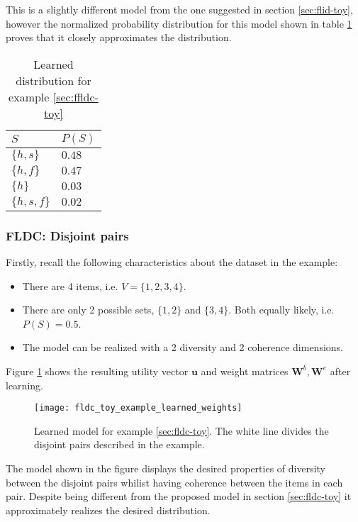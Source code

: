 This is a slightly different model from the one suggested in section \ref{sec:flid-toy}, however the normalized probability distribution for this model shown in table \ref{tab:flid-toy-learned-probs} proves that it closely approximates the distribution.

\begin{table}
  \centering
  \caption{Learned distribution for example \ref{sec:ffldc-toy}}
  \begin{tabular}{@{}ll@{}}
    \toprule
    $S$ & $P(S)$\\
    \midrule
    $\{h,s\}$ & $0.48$ \\
    $\{h,f\}$ & $0.47$ \\
    $\{h\}$ & $0.03$ \\
    $\{h,s,f\}$ & $0.02$ \\
    \bottomrule
  \end{tabular}
  \label{tab:flid-toy-learned-probs}
\end{table}

\subsubsection{FLDC: Disjoint pairs}

Firstly, recall the following characteristics about the dataset in the example:

\begin{itemize}
  \item There are 4 items, i.e. $V = \{1,2,3,4\}$.
  \item There are only 2 possible sets, $\{1,2\}$ and $\{3,4\}$. Both equally likely, i.e. $P(S) = 0.5$.
  \item The model can be realized with a 2 diversity and 2 coherence dimensions.
\end{itemize}

Figure \ref{fig:fldc-toy-learned-weights} shows the resulting utility vector $\mathbf{u}$ and weight matrices $\mathbf{W}^{b}, \mathbf{W}^{e}$ after learning.

\begin{figure}
  \centering
  \texttt{[image: fldc\_toy\_example\_learned\_weights]}
  \caption{Learned model for example \ref{sec:fldc-toy}. The white line divides the disjoint pairs described in the example.}
  \label{fig:fldc-toy-learned-weights}
\end{figure}

The model shown in the figure displays the desired properties of diversity between the disjoint pairs whilist having coherence between the items in each pair. Despite being different from the proposed model in section \ref{sec:fldc-toy} it approximately realizes the desired distribution.

